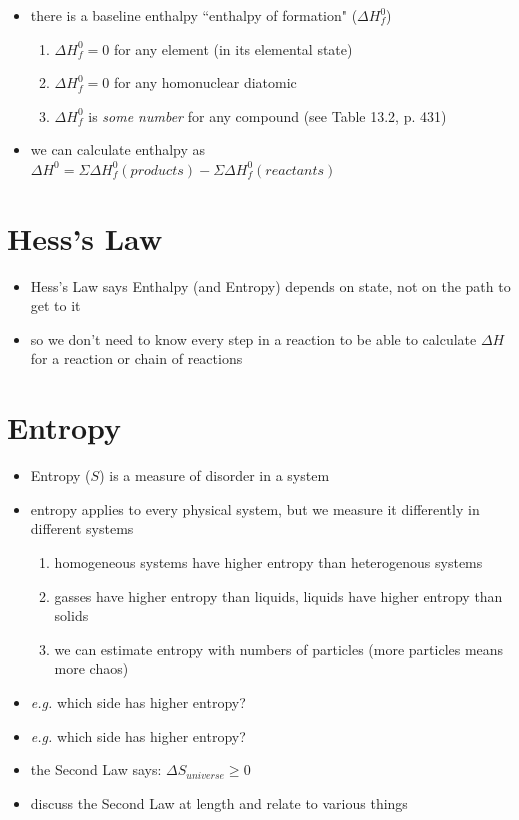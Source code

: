 \documentclass[10pt, oneside]{article}   	%
\begin{document}
\begin{itemize}
\item there is a baseline enthalpy ``enthalpy of formation" ($\Delta H_{f}^{0}$)
\begin{enumerate}
\item $\Delta H_{f}^{0} = 0$ for any element (in its elemental state)
\item $\Delta H_{f}^{0} = 0$ for any homonuclear diatomic
\item $\Delta H_{f}^{0} $ is \emph{some number} for any compound (see Table 13.2, p. 431)
\end{enumerate}
\item we can calculate enthalpy as $\Delta H^{0} = \Sigma \Delta H_{f} ^{0} (products) - \Sigma \Delta H_{f} ^{0} (reactants)$ 
\end{itemize}

\section*{Hess's Law}

\begin{itemize}
\item Hess's Law says Enthalpy (and Entropy) depends on state, not on the path to get to it
\item so we don't need to know every step in a reaction to be able to calculate $\Delta H$ for a reaction or chain of reactions
\end{itemize}

\section*{Entropy}

\begin{itemize}
\item Entropy ($S$) is a measure of disorder in a system
\item entropy applies to every physical system, but we measure it differently in different systems
\begin{enumerate}
\item homogeneous systems have higher entropy than heterogenous systems
\item gasses have higher entropy than liquids, liquids have higher entropy than solids
\item we can estimate entropy with numbers of particles (more particles means more chaos)
\end{enumerate}
\item \emph{e.g.} which side has higher entropy? 
\item \emph{e.g.} which side has higher entropy? 
\item the Second Law says: $\Delta S_{universe} \ge 0$
\item discuss the Second Law at length and relate to various things
\end{itemize}
\end{document}

